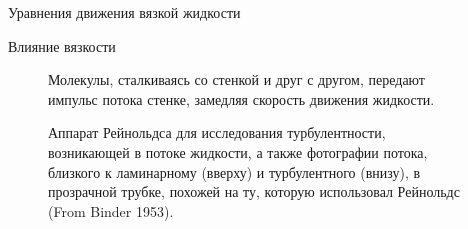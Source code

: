 \begin{chapter}{Уравнения движения вязкой жидкости}
\begin{section}{Влияние вязкости}
\begin{figure}[t!]
\caption{Молекулы, сталкиваясь со стенкой и друг с другом, передают
импульс потока стенке, замедляя скорость движения
жидкости.}
\label{fig:viscositysketch}
\end{figure}
%
%

\begin{figure}[t!]
\caption{Аппарат Рейнольдса для исследования турбулентности, возникающей
в потоке жидкости, а также фотографии потока, 
близкого к ламинарному (вверху) и турбулентного (внизу), в прозрачной трубке, 
похожей на ту, которую использовал Рейнольдс (From Binder 1953).}
\label{fig:reynoldsexp}
\end{figure}
%
\end{section}


\end{chapter}
